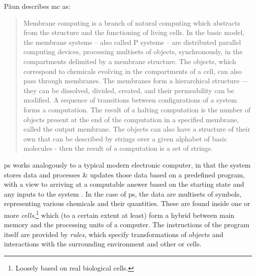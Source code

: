 
Păun describes \gls{mc} as:
\blockcquote[][p.~VII]{Paun2002}{Membrane computing is a branch of natural computing which abstracts from the structure and the functioning of living cells. In the basic model, the membrane systems -- also called P systems -- are distributed parallel computing devices, processing multisets of objects, synchronously, in the compartments delimited by a membrane structure. The objects, which correspond to chemicals evolving in the compartments of a cell, can also pass through membranes. The membranes form a hierarchical structure --- they can be dissolved, divided, created, and their permeability can be modified. A sequence of transitions between configurations of a system forms a computation. The result of a halting computation is the number of objects present at the end of the computation in a specified membrane, called the output membrane. The objects can also have a structure of their own that can be described by strings over a given alphabet of basic molecules - then the result of a computation is a set of strings.}

\Gls{ps} works analogously to a typical modern electronic computer, in that the system stores data and processes \& updates those data based on a predefined program, with a view to arriving at a computable answer based on the starting state and any inputs to the system \cite{Paun2002,Paun2010b}.  In the case of \gls{ps}, the data are multisets of symbols, representing various chemicals and their quantities.  These are found inside one or more \emph{cells},\footnote{Loosely based on real biological cells.} which (to a certain extent at least) form a hybrid between main memory and the processing units of a computer.  The instructions of the program itself are provided by \emph{rules}, which specify transformations of objects and interactions with the surrounding environment and other  or cells.

